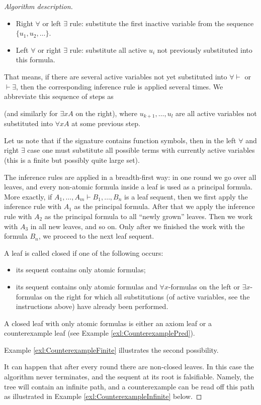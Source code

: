 \begin{page}
\begin{proof}[Algorithm description]
\begin{itemize}
\item
Right $\forall$ or left $\exists$ rule:
substitute the first inactive variable from the sequence $\{u_1, u_2, \ldots\}$.
\item
Left $\forall$ or right $\exists$ rule:
substitute all active $u_i$ not previously substituted into this formula.
\end{itemize}
That means, if there are several active variables not yet substituted into $\forall \vdash$ or $\vdash \exists$,
then the corresponding inference rule is applied several times.
We abbreviate this sequence of steps as
\begin{prooftree}
\end{prooftree}
(and similarly for $\exists x A$ on the right),
where $u_{k+1}, \ldots, u_l$ are all active variables not substituted into $\forall x A$ at some previous step.

Let us note that if the signature contains function symbols, then in the left $\forall$ and right $\exists$ case one
must substitute all possible terms with currently active variables (this is a finite but possibly quite large set).

The inference rules are applied in a breadth-first way:
in one round we go over all leaves, and every non-atomic formula inside a leaf is used as a principal formula.
More exactly, if $A_1, \ldots, A_m \vdash B_1, \ldots, B_n$ is a leaf sequent,
then we first apply the inference rule with $A_1$ as the principal formula.
After that we apply the inference rule with $A_2$ as the principal formula to all ``newly grown'' leaves.
Then we work with $A_3$ in all new leaves, and so on.
Only after we finished the work with the formula $B_n$, we proceed to the next leaf sequent.

A leaf is called closed if one of the following occurs:
\begin{itemize}
\item
its sequent contains only atomic formulas;
\item
its sequent contains only atomic formulas and $\forall x$-formulas on the left or $\exists x$-formulas on the right
for which all substitutions (of active variables, see the instructions above) have already been performed.
\end{itemize}

A closed leaf with only atomic formulas is either an axiom leaf or a counterexample leaf (see Example \ref{exl:CounterexamplePred}).

Example \ref{exl:CounterexampleFinite} illustrates the second possibility.

It can happen that after every round there are non-closed leaves.
In this case the algorithm never terminates, and the sequent at its root is falsifiable.
Namely, the tree will contain an infinite path, and a counterexample can be read off this path as illustrated in Example \ref{exl:CounterexampleInfinite} below.
\end{proof}


\end{page}

